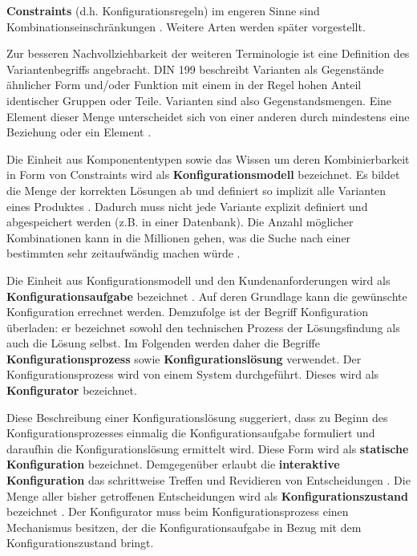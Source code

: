 \documentclass[12pt,a4paper,bibliography=totocnumbered,listof=totoc]{scrartcl}
\begin{document}
\textbf{Constraints} (d.h. Konfigurationsregeln) im engeren Sinne sind Kombinationseinschränkungen \citep{felferning14}. Weitere Arten werden später vorgestellt.

Zur besseren Nachvollziehbarkeit der weiteren Terminologie ist eine Definition des Variantenbegriffs angebracht. DIN 199 beschreibt Varianten als \glqq Gegenstände ähnlicher Form und/oder Funktion mit einem in der Regel hohen Anteil identischer Gruppen oder Teile\grqq{}. Varianten sind also Gegenstandsmengen. Eine Element dieser Menge unterscheidet sich von einer anderen durch mindestens eine Beziehung oder ein Element \citep{lutz11}.

Die Einheit aus Komponententypen sowie das Wissen um deren Kombinierbarkeit in Form von Constraints wird als \textbf{Konfigurationsmodell} bezeichnet. Es bildet die Menge der korrekten Lösungen ab und definiert so implizit alle Varianten eines Produktes \citep{soininen98}. Dadurch muss nicht jede Variante explizit definiert und abgespeichert werden (z.B. in einer Datenbank). Die Anzahl möglicher Kombinationen kann in die Millionen gehen, was die Suche nach einer bestimmten sehr zeitaufwändig machen würde \citep{falkner11}.

Die Einheit aus Konfigurationsmodell und den Kundenanforderungen wird als \textbf{Konfigurationsaufgabe} bezeichnet \citep{felferning14}. Auf deren Grundlage kann die gewünschte Konfiguration errechnet werden. Demzufolge ist der Begriff Konfiguration überladen: er bezeichnet sowohl den technischen Prozess der Lösungsfindung als auch die Lösung selbst. Im Folgenden werden daher die Begriffe \textbf{Konfigurationsprozess} sowie \textbf{Konfigurationslösung} verwendet. Der Konfigurationsprozess wird von einem System durchgeführt. Dieses wird als \textbf{Konfigurator} bezeichnet.

Diese Beschreibung einer Konfigurationslösung suggeriert, dass zu Beginn des Konfigurationsprozesses einmalig die Konfigurationsaufgabe formuliert und daraufhin die Konfigurationslösung ermittelt wird. Diese Form wird als \textbf{statische Konfiguration} bezeichnet. Demgegenüber erlaubt die \textbf{interaktive Konfiguration} das schrittweise Treffen und Revidieren von Entscheidungen \citep{hadzic04}. Die Menge aller bisher getroffenen Entscheidungen wird als \textbf{Konfigurationszustand} bezeichnet \citep{tactonTCsiteDevelopmentManual}. Der Konfigurator muss beim Konfigurationsprozess einen Mechanismus besitzen, der die Konfigurationsaufgabe in Bezug mit dem Konfigurationszustand bringt.
\end{document}
